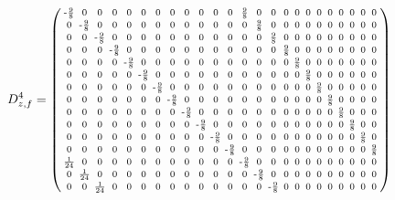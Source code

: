 \documentclass[pdftex,a4paper,parskip,listof=totoc,bibliography=totoc,onehalfspacing,12pt]{scrreprt}
\begin{document}
\begin{align*}
	D_{z,f}^4 &= \begin{psmallmatrix}
\text{-}\frac{9}{8} & 0 & 0 & 0 & 0 & 0 & 0 & 0 & 0 & 0 & 0 & 0 & \frac{9}{8} & 0 & 0 & 0 & 0 & 0 & 0 & 0 & 0 & 0 & 0 & 0 \\
0 & \text{-}\frac{9}{8} & 0 & 0 & 0 & 0 & 0 & 0 & 0 & 0 & 0 & 0 & 0 & \frac{9}{8} & 0 & 0 & 0 & 0 & 0 & 0 & 0 & 0 & 0 & 0 \\
0 & 0 & \text{-}\frac{9}{8} & 0 & 0 & 0 & 0 & 0 & 0 & 0 & 0 & 0 & 0 & 0 & \frac{9}{8} & 0 & 0 & 0 & 0 & 0 & 0 & 0 & 0 & 0 \\
0 & 0 & 0 & \text{-}\frac{9}{8} & 0 & 0 & 0 & 0 & 0 & 0 & 0 & 0 & 0 & 0 & 0 & \frac{9}{8} & 0 & 0 & 0 & 0 & 0 & 0 & 0 & 0 \\
0 & 0 & 0 & 0 & \text{-}\frac{9}{8} & 0 & 0 & 0 & 0 & 0 & 0 & 0 & 0 & 0 & 0 & 0 & \frac{9}{8} & 0 & 0 & 0 & 0 & 0 & 0 & 0 \\
0 & 0 & 0 & 0 & 0 & \text{-}\frac{9}{8} & 0 & 0 & 0 & 0 & 0 & 0 & 0 & 0 & 0 & 0 & 0 & \frac{9}{8} & 0 & 0 & 0 & 0 & 0 & 0 \\
0 & 0 & 0 & 0 & 0 & 0 & \text{-}\frac{9}{8} & 0 & 0 & 0 & 0 & 0 & 0 & 0 & 0 & 0 & 0 & 0 & \frac{9}{8} & 0 & 0 & 0 & 0 & 0 \\
0 & 0 & 0 & 0 & 0 & 0 & 0 & \text{-}\frac{9}{8} & 0 & 0 & 0 & 0 & 0 & 0 & 0 & 0 & 0 & 0 & 0 & \frac{9}{8} & 0 & 0 & 0 & 0 \\
0 & 0 & 0 & 0 & 0 & 0 & 0 & 0 & \text{-}\frac{9}{8} & 0 & 0 & 0 & 0 & 0 & 0 & 0 & 0 & 0 & 0 & 0 & \frac{9}{8} & 0 & 0 & 0 \\
0 & 0 & 0 & 0 & 0 & 0 & 0 & 0 & 0 & \text{-}\frac{9}{8} & 0 & 0 & 0 & 0 & 0 & 0 & 0 & 0 & 0 & 0 & 0 & \frac{9}{8} & 0 & 0 \\
0 & 0 & 0 & 0 & 0 & 0 & 0 & 0 & 0 & 0 & \text{-}\frac{9}{8} & 0 & 0 & 0 & 0 & 0 & 0 & 0 & 0 & 0 & 0 & 0 & \frac{9}{8} & 0 \\
0 & 0 & 0 & 0 & 0 & 0 & 0 & 0 & 0 & 0 & 0 & \text{-}\frac{9}{8} & 0 & 0 & 0 & 0 & 0 & 0 & 0 & 0 & 0 & 0 & 0 & \frac{9}{8} \\
\frac{1}{24} & 0 & 0 & 0 & 0 & 0 & 0 & 0 & 0 & 0 & 0 & 0 & \text{-}\frac{9}{8} & 0 & 0 & 0 & 0 & 0 & 0 & 0 & 0 & 0 & 0 & 0 \\
0 & \frac{1}{24} & 0 & 0 & 0 & 0 & 0 & 0 & 0 & 0 & 0 & 0 & 0 & \text{-}\frac{9}{8} & 0 & 0 & 0 & 0 & 0 & 0 & 0 & 0 & 0 & 0 \\
0 & 0 & \frac{1}{24} & 0 & 0 & 0 & 0 & 0 & 0 & 0 & 0 & 0 & 0 & 0 & \text{-}\frac{9}{8} & 0 & 0 & 0 & 0 & 0 & 0 & 0 & 0 & 0 \\

\end{psmallmatrix}
\end{align*}
\end{document}
